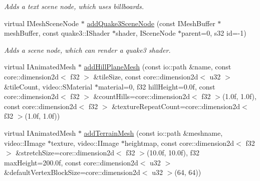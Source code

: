 \begin{DoxyCompactItemize}
\begin{DoxyCompactList}\small\item\em Adds a text scene node, which uses billboards. \end{DoxyCompactList}\item 
\hypertarget{classirr_1_1scene_1_1_c_scene_manager_a05ff3e15b7a4fa1fcc468ed66a736177}{virtual I\-Mesh\-Scene\-Node $\ast$ \hyperlink{classirr_1_1scene_1_1_c_scene_manager_a05ff3e15b7a4fa1fcc468ed66a736177}{add\-Quake3\-Scene\-Node} (const I\-Mesh\-Buffer $\ast$mesh\-Buffer, const quake3\-::\-I\-Shader $\ast$shader, I\-Scene\-Node $\ast$parent=0, s32 id=-\/1)}\label{classirr_1_1scene_1_1_c_scene_manager_a05ff3e15b7a4fa1fcc468ed66a736177}

\begin{DoxyCompactList}\small\item\em Adds a scene node, which can render a quake3 shader. \end{DoxyCompactList}\item 
virtual I\-Animated\-Mesh $\ast$ \hyperlink{classirr_1_1scene_1_1_c_scene_manager_a49c30d9eb68c40524c7c13f03278609f}{add\-Hill\-Plane\-Mesh} (const io\-::path \&name, const core\-::dimension2d$<$ f32 $>$ \&tile\-Size, const core\-::dimension2d$<$ u32 $>$ \&tile\-Count, video\-::\-S\-Material $\ast$material=0, f32 hill\-Height=0.\-0f, const core\-::dimension2d$<$ f32 $>$ \&count\-Hills=core\-::dimension2d$<$ f32 $>$(1.\-0f, 1.\-0f), const core\-::dimension2d$<$ f32 $>$ \&texture\-Repeat\-Count=core\-::dimension2d$<$ f32 $>$(1.\-0f, 1.\-0f))
\item 
\hypertarget{classirr_1_1scene_1_1_c_scene_manager_a6a65ea2326687e47e47232fbe345774a}{virtual I\-Animated\-Mesh $\ast$ \hyperlink{classirr_1_1scene_1_1_c_scene_manager_a6a65ea2326687e47e47232fbe345774a}{add\-Terrain\-Mesh} (const io\-::path \&meshname, video\-::\-I\-Image $\ast$texture, video\-::\-I\-Image $\ast$heightmap, const core\-::dimension2d$<$ f32 $>$ \&stretch\-Size=core\-::dimension2d$<$ f32 $>$(10.\-0f, 10.\-0f), f32 max\-Height=200.\-0f, const core\-::dimension2d$<$ u32 $>$ \&default\-Vertex\-Block\-Size=core\-::dimension2d$<$ u32 $>$(64, 64))}\label{classirr_1_1scene_1_1_c_scene_manager_a6a65ea2326687e47e47232fbe345774a}


\end{DoxyCompactItemize}
